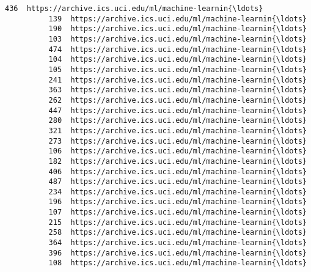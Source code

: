 \documentclass[11pt]{article}
\begin{document}
\begin{Verbatim}[commandchars=\\\{\}]
          436  https://archive.ics.uci.edu/ml/machine-learnin{\ldots}   
          139  https://archive.ics.uci.edu/ml/machine-learnin{\ldots}   
          190  https://archive.ics.uci.edu/ml/machine-learnin{\ldots}   
          103  https://archive.ics.uci.edu/ml/machine-learnin{\ldots}   
          474  https://archive.ics.uci.edu/ml/machine-learnin{\ldots}   
          104  https://archive.ics.uci.edu/ml/machine-learnin{\ldots}   
          105  https://archive.ics.uci.edu/ml/machine-learnin{\ldots}   
          241  https://archive.ics.uci.edu/ml/machine-learnin{\ldots}   
          363  https://archive.ics.uci.edu/ml/machine-learnin{\ldots}   
          262  https://archive.ics.uci.edu/ml/machine-learnin{\ldots}   
          447  https://archive.ics.uci.edu/ml/machine-learnin{\ldots}   
          280  https://archive.ics.uci.edu/ml/machine-learnin{\ldots}   
          321  https://archive.ics.uci.edu/ml/machine-learnin{\ldots}   
          273  https://archive.ics.uci.edu/ml/machine-learnin{\ldots}   
          106  https://archive.ics.uci.edu/ml/machine-learnin{\ldots}   
          182  https://archive.ics.uci.edu/ml/machine-learnin{\ldots}   
          406  https://archive.ics.uci.edu/ml/machine-learnin{\ldots}   
          487  https://archive.ics.uci.edu/ml/machine-learnin{\ldots}   
          234  https://archive.ics.uci.edu/ml/machine-learnin{\ldots}   
          196  https://archive.ics.uci.edu/ml/machine-learnin{\ldots}   
          107  https://archive.ics.uci.edu/ml/machine-learnin{\ldots}   
          215  https://archive.ics.uci.edu/ml/machine-learnin{\ldots}   
          258  https://archive.ics.uci.edu/ml/machine-learnin{\ldots}   
          364  https://archive.ics.uci.edu/ml/machine-learnin{\ldots}   
          396  https://archive.ics.uci.edu/ml/machine-learnin{\ldots}   
          108  https://archive.ics.uci.edu/ml/machine-learnin{\ldots}   
          

\end{Verbatim}
\end{document}
